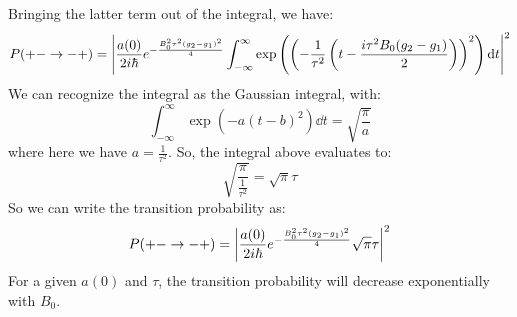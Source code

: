 \documentclass[12pt]{article}
\begin{document}
Bringing the latter term out of the integral, we have:
\begin{equation}
  P(+-\rightarrow-+) = \abs{\frac{a(0)}{2i\hbar}e^{-\frac{B_0^2 \tau^2 (g_2 - g_1)^2}{4}}\int_{-\infty}^{\infty} \exp\left(\left(-\frac{1}{\tau^2}\left(t- \frac{i\tau^2 B_0(g_2 - g_1)}{2}\right)\right)^2\right)\dd{t}}^2
\end{equation}
We can recognize the integral as the Gaussian integral, with:
\begin{equation}
  \int_{-\infty}^{\infty} \exp\left(-a(t-b)^2\right)\dd{t} = \sqrt{\frac{\pi}{a}}
\end{equation}
where here we have $a = \frac{1}{\tau^2}$. So, the integral above evaluates to:
\begin{equation}
  \sqrt{\frac{\pi}{\frac{1}{\tau^2}}} = \sqrt{\pi}\tau
\end{equation}
So we can write the transition probability as:
\begin{equation}
  P(+-\rightarrow-+) = \abs{\frac{a(0)}{2i\hbar}e^{-\frac{B_0^2 \tau^2 (g_2 - g_1)^2}{4}}\sqrt{\pi}\tau}^2
\end{equation}
For a given $a(0)$ and $\tau$, the transition probability will decrease exponentially with $B_0$.\\
\end{document}
